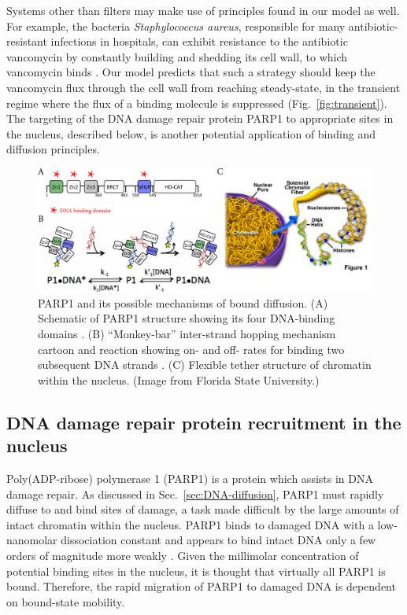 Systems other than filters may make use of principles found in our model as well.  For example, the bacteria \textit{Staphylococcus aureus}, responsible for many antibiotic-resistant infections in hospitals, can exhibit resistance to the antibiotic vancomycin by constantly building and shedding its cell wall, to which vancomycin binds \cite{mcguinness17}.  Our model predicts that such a strategy should keep the vancomycin flux through the cell wall from reaching steady-state, in the transient regime where the flux of a binding molecule is suppressed (Fig.~\ref{fig:transient}).  The targeting of the DNA damage repair protein PARP1 to appropriate sites in the nucleus, described below, is another potential application of binding and diffusion principles.

\begin{figure}
\centering
\includegraphics[width=\linewidth]{figs/ch02/PARP1.pdf}
\caption[Possible bound-diffusion mechanisms of PARP1.]{PARP1 and its possible mechanisms of bound diffusion. (A) Schematic of PARP1 structure showing its four DNA-binding domains \cite{rudolph18}. (B) ``Monkey-bar'' inter-strand hopping mechanism cartoon and reaction showing on- and off- rates for binding two subsequent DNA strands \cite{rudolph18}.  (C) Flexible tether structure of chromatin within the nucleus.  (Image from Florida State University.)}
\label{fig:parp1}
\end{figure}

\subsection{DNA damage repair protein recruitment in the nucleus}
\label{sec:parp1}

Poly(ADP-ribose) polymerase 1 (PARP1) is a protein  which assists in DNA damage repair.  As discussed in Sec.~\ref{sec:DNA-diffusion}, PARP1 must rapidly diffuse to and bind sites of damage, a task made difficult by the large amounts of intact chromatin within the nucleus.  PARP1 binds to damaged DNA with a low-nanomolar dissociation constant and appears to bind intact DNA only a few orders of magnitude more weakly \cite{rudolph18,sukhanova16}.  Given the millimolar concentration of potential binding sites in the nucleus, it is thought that virtually all PARP1 is bound.  Therefore, the rapid migration of PARP1 to damaged DNA is dependent on bound-state mobility.

